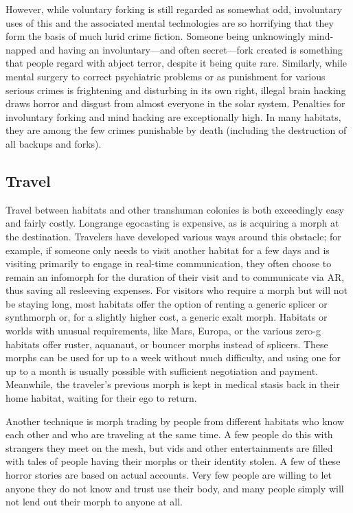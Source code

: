 However, while voluntary forking is still regarded as somewhat odd,
involuntary uses of this and the associated mental technologies are so
horrifying that they form the basis of much lurid crime
fiction. Someone being unknowingly mind-napped and having an
involuntary—and often secret—fork created is something that people
regard with abject terror, despite it being quite rare. Similarly,
while mental surgery to correct psychiatric problems or as punishment
for various serious crimes is frightening and disturbing in its own
right, illegal brain hacking draws horror and disgust from almost
everyone in the solar system.  Penalties for involuntary forking and
mind hacking are exceptionally high. In many habitats, they are among
the few crimes punishable by death (including the destruction of all
backups and forks).

\subsection{Travel}
\label{sec:travel}

Travel between habitats and other transhuman colonies is both
exceedingly easy and fairly costly. Longrange egocasting is expensive,
as is acquiring a morph at the destination. Travelers have developed
various ways around this obstacle; for example, if someone only needs
to visit another habitat for a few days and is visiting primarily to
engage in real-time communication, they often choose to remain an
infomorph for the duration of their visit and to communicate via AR,
thus saving all resleeving expenses. For visitors who require a morph
but will not be staying long, most habitats offer the option of
renting a generic splicer or synthmorph or, for a slightly higher
cost, a generic exalt morph. Habitats or worlds with unusual
requirements, like Mars, Europa, or the various zero-g habitats offer
ruster, aquanaut, or bouncer morphs instead of splicers. These morphs
can be used for up to a week without much difficulty, and using one
for up to a month is usually possible with sufficient negotiation and
payment. Meanwhile, the traveler's previous morph is kept in medical
stasis back in their home habitat, waiting for their ego to return.

Another technique is morph trading by people from different habitats
who know each other and who are traveling at the same time. A few
people do this with strangers they meet on the mesh, but vids and
other entertainments are filled with tales of people having their
morphs or their identity stolen. A few of these horror stories are
based on actual accounts. Very few people are willing to let anyone
they do not know and trust use their body, and many people simply will
not lend out their morph to anyone at all.

